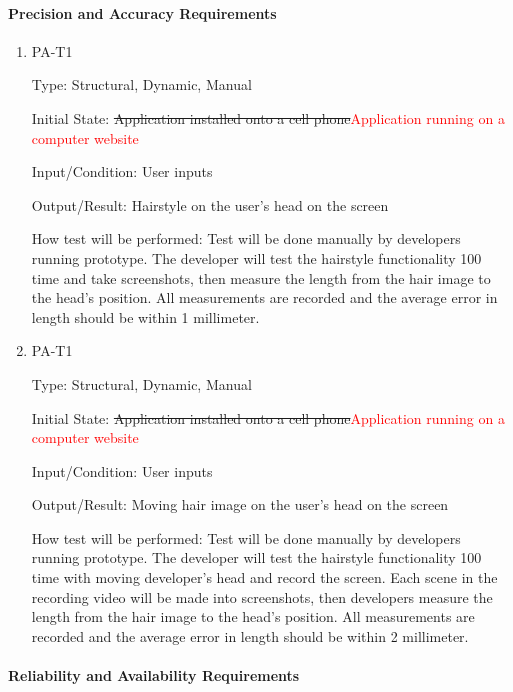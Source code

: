 \documentclass[12pt, titlepage]{article}
\begin{document}
\paragraph{Precision and Accuracy Requirements}

\begin{enumerate}

\item{PA-T1\\}

Type: Structural, Dynamic, Manual
					
Initial State: \sout{Application installed onto a cell phone}\textcolor{red}{Application running on a computer website}
					
Input/Condition: User inputs
					
Output/Result: Hairstyle on the user's head on the screen
					
How test will be performed: Test will be done manually by developers running prototype. The developer will test the hairstyle functionality 100 time and take screenshots, then measure the length from the hair image to the head's position. All measurements are recorded and the average error in length should be within 1 millimeter. 
					
\item{PA-T1\\}

Type: Structural, Dynamic, Manual
					
Initial State: \sout{Application installed onto a cell phone}\textcolor{red}{Application running on a computer website}
					
Input/Condition: User inputs
					
Output/Result: Moving hair image on the user's head on the screen
					
How test will be performed: Test will be done manually by developers running prototype. The developer will test the hairstyle functionality 100 time with moving developer's head and record the screen. Each scene in the recording video will be made into screenshots, then developers measure the length from the hair image to the head's position. All measurements are recorded and the average error in length should be within 2 millimeter.

\end{enumerate}

\paragraph{Reliability and Availability Requirements}
\end{document}
